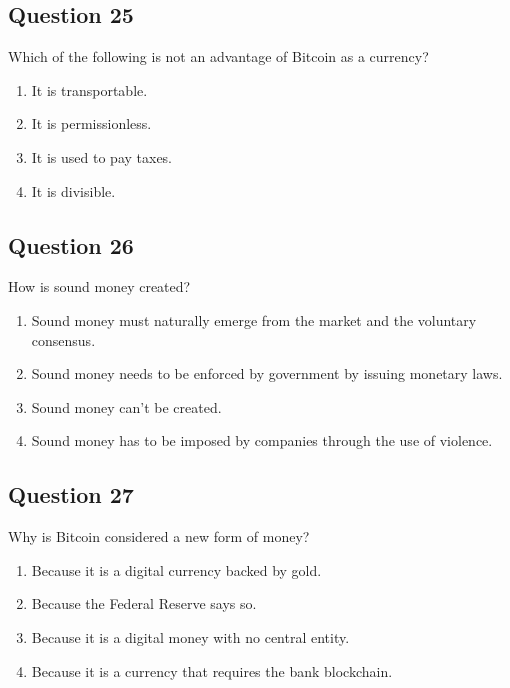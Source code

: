 \documentclass[12pt,a4paper]{article}
\begin{document}
\bigskip


\subsection*{Question 25}
Which of the following is not an advantage of Bitcoin as a currency?

\begin{enumerate}[label=\Alph*., leftmargin=*]
\item It is transportable.
\item It is permissionless.
\item It is used to pay taxes.
\item It is divisible.
\end{enumerate}

\bigskip


\subsection*{Question 26}
How is sound money created?

\begin{enumerate}[label=\Alph*., leftmargin=*]
\item Sound money must naturally emerge from the market and the voluntary consensus.
\item Sound money needs to be enforced by government by issuing monetary laws.
\item Sound money can't be created.
\item Sound money has to be imposed by companies through the use of violence.
\end{enumerate}

\bigskip


\subsection*{Question 27}
Why is Bitcoin considered a new form of money?

\begin{enumerate}[label=\Alph*., leftmargin=*]
\item Because it is a digital currency backed by gold.
\item Because the Federal Reserve says so.
\item Because it is a digital money with no central entity.
\item Because it is a currency that requires the bank blockchain.
\end{enumerate}
\end{document}
